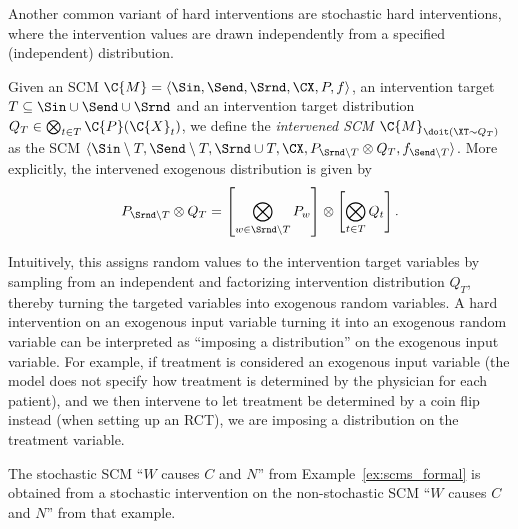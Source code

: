 Another common variant of hard interventions are stochastic hard interventions, where the intervention
values are drawn independently from a specified (independent) distribution.
\begin{Def}\label{def:scm_hard_intervention_stochastic}
  Given an SCM $\C{M} = \langle \Sin, \Send, \Srnd, \CX, P, f \rangle$, an intervention target $T \subseteq \Sin \cup \Send \cup \Srnd$ 
  and an intervention target distribution $Q_T \in \bigotimes_{t\in T} \C{P}(\C{X}_t)$, we define the \emph{intervened SCM
  $\C{M}_{\doit(\XT\sim Q_T)}$} as the SCM 
  $\langle \Sin\setminus T,\Send\setminus T,\Srnd \cup T,\CX,P_{\Srnd\setminus T} \otimes Q_T,f_{\Send\setminus T} \rangle$.
  More explicitly, the intervened exogenous distribution is given by
  $$P_{\Srnd\setminus T} \otimes Q_T = \left[\bigotimes_{w \in \Srnd\setminus T} P_w\right] \otimes \left[\bigotimes_{t \in T} Q_t\right].$$
\end{Def}
Intuitively, this assigns random values to the intervention target variables
by sampling from an independent and factorizing intervention distribution $Q_T$, thereby
turning the targeted variables into exogenous random variables.
A hard intervention on an exogenous input variable turning it into an exogenous random variable
can be interpreted as ``imposing a distribution'' on the exogenous input variable.
For example, if treatment is considered an exogenous input variable (the model does not specify 
how treatment is determined by the physician for each patient), and we then intervene to let 
treatment be determined by a coin flip instead (when setting up an RCT),
we are imposing a distribution on the treatment variable.
\begin{Eg}
  The stochastic SCM ``$W$ causes $C$ and $N$'' from Example~\ref{ex:scms_formal} is obtained from 
  a stochastic intervention on the non-stochastic SCM ``$W$ causes $C$ and $N$'' from that example.
\end{Eg}

